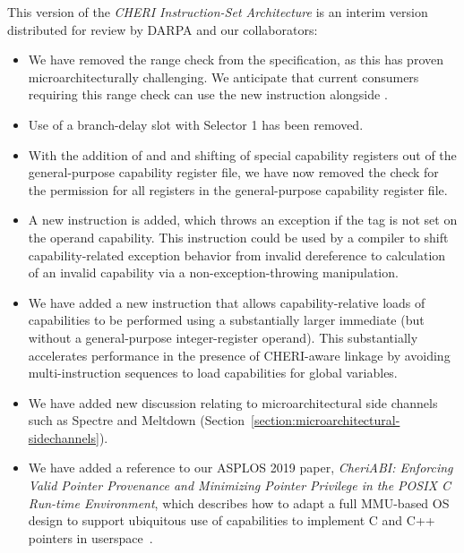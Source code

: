 This version of the \textit{CHERI Instruction-Set Architecture} is an interim
version distributed for review by DARPA and our collaborators:

\begin{itemize}
\item We have removed the range check from the 
  specification, as this has proven microarchitecturally challenging.
  We anticipate that current consumers requiring this range check can use the
  new  instruction alongside .

\item Use of a branch-delay slot with  Selector
  1 has been removed.

\item With the addition of  and 
  and shifting of special capability registers out of the
  general-purpose capability register file, we have now removed the check for
  the \cappermASR permission for all registers in the
  general-purpose capability register file.

\item A new  instruction is added, which
  throws an exception if the tag is not set on the operand capability.
  This instruction could be used by a compiler to shift capability-related
  exception behavior from invalid dereference to calculation of an invalid
  capability via a non-exception-throwing manipulation.

\item We have added a new  instruction that
  allows capability-relative loads of capabilities to be performed using a
  substantially larger immediate (but without a general-purpose
  integer-register operand).
  This substantially accelerates performance in the presence of CHERI-aware
  linkage by avoiding multi-instruction sequences to load capabilities for
  global variables.

\item We have added new discussion relating to microarchitectural side
  channels such as Spectre and Meltdown
  (Section~\ref{section:microarchitectural-sidechannels}).

\item We have added a reference to our ASPLOS 2019 paper, \textit{CheriABI:
  Enforcing Valid Pointer Provenance and Minimizing Pointer Privilege in the
  POSIX C Run-time Environment}, which describes how to adapt a full MMU-based
  OS design to support ubiquitous use of capabilities to implement C and C++
  pointers in userspace~\cite{davis2019:cheriabi}.


\end{itemize}
